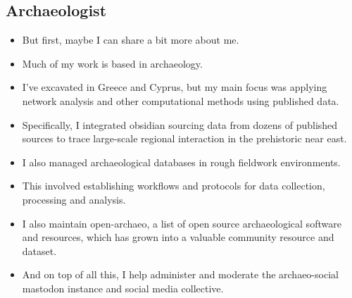 \documentclass{article}
\begin{document}
\subsection{Archaeologist}
\begin{itemize}
  \item But first, maybe I can share a bit more about me.
  \item Much of my work is based in archaeology.
  \item I’ve excavated in Greece and Cyprus, but my main focus was applying network analysis and other computational methods using published data.
  \item Specifically, I integrated obsidian sourcing data from dozens of published sources to trace large-scale regional interaction in the prehistoric near east.
  \item I also managed archaeological databases in rough fieldwork environments.
  \item This involved establishing workflows and protocols for data collection, processing and analysis.
  \item I also maintain open-archaeo, a list of open source archaeological software and resources, which has grown into a valuable community resource and dataset.
  \item And on top of all this, I help administer and moderate the archaeo-social mastodon instance and social media collective.
\end{itemize}
\end{document}
